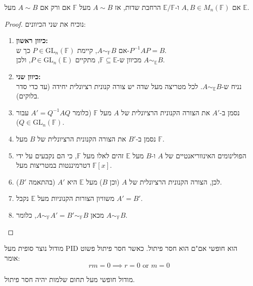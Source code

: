 \documentclass{tstextbook}
\begin{document}
\begin{corollary}
אם \(A, B \in M_n(\mathbb{F})\) ו-\(\mathbb{E}/\mathbb{F}\) הרחבת שדות, אז \(A \sim B\) מעל \(\mathbb{F}\) אם ורק אם \(A \sim B\) מעל \(\mathbb{E}\).

\end{corollary}
\begin{proof}
נוכיח את שני הכיוונים:

  \begin{enumerate}
    \item \textbf{כיוון ראשון:}\\

   אם \(A \sim_{\mathbb{F}} B\), קיימת \(P \in \mathrm{GL}_n(\mathbb{F})\) כך ש-\(P^{-1} A P = B\).\\

   מכיוון ש-\(\mathbb{F} \subseteq \mathbb{E}\), מתקיים \(P \in \mathrm{GL}_n(\mathbb{E})\), ולכן \(A \sim_{\mathbb{E}} B\).


    \item \textbf{כיוון שני:}\\

   נניח ש-\(A \sim_{\mathbb{E}} B\). לכל מטריצה מעל שדה יש צורה קנונית רציונלית יחידה (עד כדי סדר בלוקים).  


    \item נסמן ב-\(A'\) את הצורה הקנונית הרציונלית של \(A\) מעל \(\mathbb{F}\) (כלומר \(A' = Q^{-1} A Q\) עבור \(Q \in \mathrm{GL}_n(\mathbb{F})\)).  
    \item נסמן ב-\(B'\) את הצורה הקנונית הרציונלית של \(B\) מעל \(\mathbb{F}\).  
    \item הפולינומים האינווריאנטיים של \(A\) ו-\(B\) מעל \(\mathbb{E}\) זהים לאלו מעל \(\mathbb{F}\), כי הם נקבעים על ידי דטרמיננטות במטריצות מעל \(\mathbb{F}[x]\).  
    \item לכן, הצורה הקנונית הרציונלית של \(A\) (וכן \(B\)) מעל \(\mathbb{E}\) היא \(A'\) (בהתאמה \(B'\)).  
    \item משוויון הצורות הקנוניות מעל \(\mathbb{E}\) נקבל \(A' = B'\).  
    \item מכאן \(A \sim_{\mathbb{F}} A' = B' \sim_{\mathbb{F}} B\), כלומר \(A \sim_{\mathbb{F}} B\).
  \end{enumerate}
\end{proof}
\begin{corollary}
מודול נוצר סופית מעל PID הוא חופשי אם"ם הוא חסר פיתול.
כאשר חסר פיתול פשוט אומר:
$$r m =0 \implies r =0 \text{ or }m=0$$

\end{corollary}
מודול חופשי מעל תחום שלמות יהיה חסר פיתול. 
\end{document}
